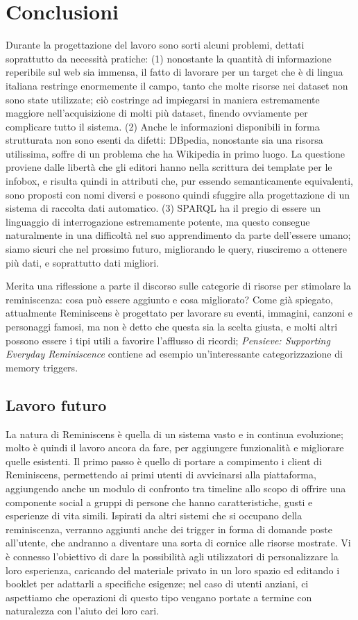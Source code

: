\documentclass[sigproc-sp.tex]{subfiles}
\begin{document}
\section{Conclusioni}
Durante la progettazione del lavoro sono sorti alcuni problemi, dettati soprattutto da necessità pratiche: (1) nonostante la quantità di informazione reperibile sul web sia immensa, il fatto di lavorare per un target che è di lingua italiana restringe enormemente il campo, tanto che molte risorse nei dataset non sono state utilizzate; ciò costringe ad impiegarsi in maniera estremamente maggiore nell’acquisizione di molti più dataset, finendo ovviamente per complicare tutto il sistema. (2) Anche le informazioni disponibili in forma strutturata non sono esenti da difetti: DBpedia, nonostante sia una risorsa utilissima, soffre di un problema che ha Wikipedia in primo luogo. La questione proviene dalle libertà che gli editori hanno nella scrittura dei template per le infobox, e risulta quindi in attributi che, pur essendo semanticamente equivalenti, sono proposti con nomi diversi e possono quindi sfuggire alla progettazione di un sistema di raccolta dati automatico. (3) SPARQL ha il pregio di essere un linguaggio di interrogazione estremamente potente, ma questo consegue naturalmente in una difficoltà nel suo apprendimento da parte dell'essere umano; siamo sicuri che nel prossimo futuro, migliorando le query, riusciremo a ottenere più dati, e soprattutto dati migliori.

Merita una riflessione a parte il discorso sulle categorie di risorse per stimolare la reminiscenza: cosa può essere aggiunto e cosa migliorato? Come già spiegato, attualmente Reminiscens è progettato per lavorare su eventi, immagini, canzoni e personaggi famosi, ma non è detto che questa sia la scelta giusta, e molti altri possono essere i tipi utili a favorire l'afflusso di ricordi; \textit{Pensieve: Supporting Everyday Reminiscence} contiene ad esempio un'interessante categorizzazione di memory triggers\cite{peesapati2010pensieve}.

\subsection{Lavoro futuro}
\label{subsec:futurework}
La natura di Reminiscens è quella di un sistema vasto e in continua evoluzione; molto è quindi il lavoro ancora da fare, per aggiungere funzionalità e migliorare quelle esistenti. Il primo passo è quello di portare a compimento i client di Reminiscens, permettendo ai primi utenti di avvicinarsi alla piattaforma, aggiungendo anche un modulo di confronto tra timeline allo scopo di offrire una componente social a gruppi di persone che hanno caratteristiche, gusti e esperienze di vita simili. Ispirati da altri sistemi che si occupano della reminiscenza, verranno aggiunti anche dei trigger in forma di domande poste all’utente, che andranno a diventare una sorta di cornice alle risorse mostrate. Vi è connesso l’obiettivo di dare la possibilità agli utilizzatori di personalizzare la loro esperienza, caricando del materiale privato in un loro spazio ed editando i booklet per adattarli a specifiche esigenze; nel caso di utenti anziani, ci aspettiamo che operazioni di questo tipo vengano portate a termine con naturalezza con l’aiuto dei loro cari. 
\end{document}
